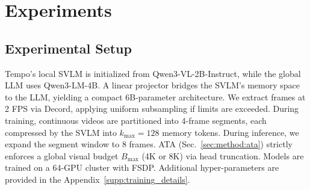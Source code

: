 \section{Experiments}
\label{sec:experiments}

\subsection{Experimental Setup}
\label{sec:exp:setup}

Tempo's local SVLM is initialized from Qwen3-VL-2B-Instruct, while the global LLM uses Qwen3-LM-4B. A linear projector bridges the SVLM's memory space to the LLM, yielding a compact 6B-parameter architecture.
%
We extract frames at 2 FPS via Decord, applying uniform subsampling if limits are exceeded. During training, continuous videos are partitioned into 4-frame segments, each compressed by the SVLM into $k_{\max}=128$ memory tokens. During inference, we expand the segment window to 8 frames. ATA (Sec.~\ref{sec:method:ata}) strictly enforces a global visual budget $B_{\max}$ (4K or 8K) via head truncation. Models are trained on a 64-GPU cluster with FSDP. Additional hyper-parameters are provided in the Appendix~\ref{supp:training_details}.

